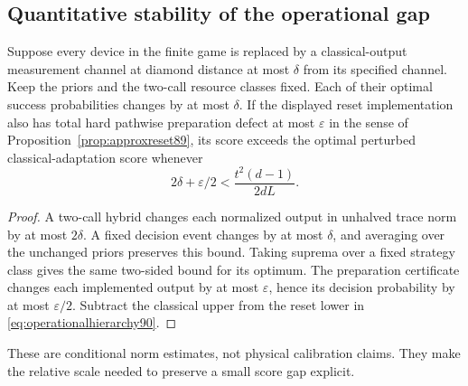 \subsection{Quantitative stability of the operational gap}
\begin{corollary}\label{cor:robustgame90}
Suppose every device in the finite game is replaced by a classical-output
measurement channel at diamond distance at most $\delta$ from its
specified channel.  Keep the priors and the two-call resource classes
fixed.  Each of their optimal success probabilities changes by at most
$\delta$.  If the displayed reset implementation also has total hard
pathwise preparation defect at most $\varepsilon$ in the sense of
Proposition~\ref{prop:approxreset89}, its score exceeds the optimal
perturbed classical-adaptation score whenever
\begin{equation}\label{eq:robustgap90}
 2\delta+\varepsilon/2<\frac{t^2(d-1)}{2dL}.
\end{equation}
\end{corollary}
\begin{proof}
A two-call hybrid changes each normalized output in unhalved trace norm
by at most $2\delta$.  A fixed decision event changes by at most
$\delta$, and averaging over the unchanged priors preserves this bound.
Taking suprema over a fixed strategy class gives the same two-sided
bound for its optimum.  The preparation certificate changes each
implemented output by at most $\varepsilon$, hence its decision
probability by at most $\varepsilon/2$.  Subtract the classical upper
from the reset lower in \eqref{eq:operationalhierarchy90}.
\end{proof}
These are conditional norm estimates, not physical calibration claims.
They make the relative scale needed to preserve a small score gap explicit.

